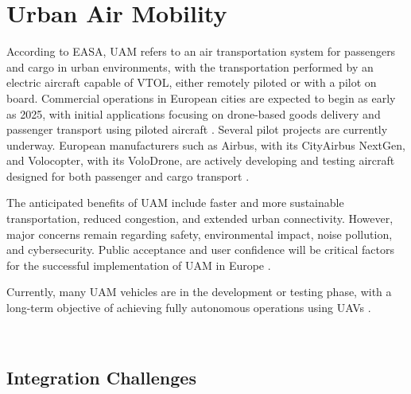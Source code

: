 \section{Urban Air Mobility}

According to \gls{EASA}, \gls{UAM} refers to an air transportation system for passengers and cargo in urban environments, with the transportation performed by an electric aircraft capable of \gls{VTOL}, either remotely piloted or with a pilot on board. 
Commercial operations in European cities are expected to begin as early as 2025, with initial applications focusing on drone-based goods delivery and passenger transport using piloted aircraft \cite{easa_uam}. 
Several pilot projects are currently underway. 
European manufacturers such as Airbus, with its CityAirbus NextGen, and Volocopter, with its VoloDrone, are actively developing and testing aircraft designed for both passenger and cargo transport \cite{gomez2024uam}.

The anticipated benefits of \gls{UAM} include faster and more sustainable transportation, reduced congestion, and extended urban connectivity. 
However, major concerns remain regarding safety, environmental impact, noise pollution, and cybersecurity.
Public acceptance and user confidence will be critical factors for the successful implementation of \gls{UAM} in Europe \cite{easa_uamlandscape}.

Currently, many \gls{UAM} vehicles are in the development or testing phase, with a long-term objective of achieving fully autonomous operations using \glspl{UAV} \cite{Vernol_2023}.


\


\subsection{Integration Challenges}